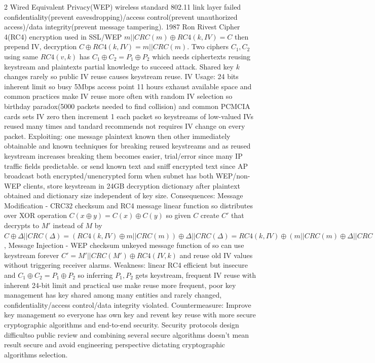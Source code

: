 \documentclass[9pt]{extarticle}
\begin{document}
\begin{multicols}{2}
Wired Equivalent Privacy(WEP) wireless standard 802.11 link layer failed confidentiality(prevent eavesdropping)/access control(prevent unauthorized access)/data integrity(prevent message tampering). 1987 Ron Rivest Cipher 4(RC4) encryption used in SSL/WEP $m||CRC(m)\oplus{RC4(k,IV)}=C$ then prepend IV, decryption $C\oplus{RC4(k,IV)}=m||CRC(m)$. Two ciphers $C_1,C_2$ using same $RC4(v,k)$ has $C_1\oplus{C_2}=P_1\oplus{P_2}$ which needs ciphertexts reusing keystream and plaintexts partial knowledge to succeed attack. Shared key $k$ changes rarely so public IV reuse causes keystream reuse. IV Usage: 24 bits inherent limit so busy 5Mbps access point 11 hours exhaust available space and common practices make IV reuse more often with random IV selection so birthday paradox(5000 packets needed to find collision) and common PCMCIA cards sets IV zero then increment 1 each packet so keystreams of low-valued IVs reused many times and tandard recommends not requires IV change on every packet. Exploiting: one message plaintext known then other immediately obtainable and known techniques for breaking reused keystreams and as reused keystream increases breaking them becomes easier, trial/error since many IP traffic fields predictable. or send known text and sniff encrypted text since AP broadcast both encrypted/unencrypted form when subnet has both WEP/non-WEP clients, store keystream in 24GB decryption dictionary after plaintext obtained and dictionary size independent of key size. Consequences: Message Modification - CRC32 checksum and RC4 message linear function so distributes over XOR operation $C(x\oplus{y})=C(x)\oplus{C(y)}$ so given $C$ create $C'$ that decrypts to $M'$ instead of $M$ by $C\oplus{\Delta||CRC(\Delta)}=(RC4(k,IV)\oplus{m||CRC(m)})\oplus{\Delta||CRC(\Delta)} = RC4(k,IV)\oplus({m||CRC(m)}\oplus{\Delta||CRC(\Delta)})= RC4(k,IV)\oplus{M'||CRC(M')}$, Message Injection - WEP checksum unkeyed message function of so can use keystream forever $C'=M'||CRC(M')\oplus{RC4(IV,k)}$ and reuse old IV values without triggering receiver alarms. Weakness: linear RC4 efficient but insecure and $C_1\oplus{C_2}=P_1\oplus{P_2}$ so inferring $P_1,P_2$ gets keystream, frequent IV reuse with inherent 24-bit limit and practical use make reuse more frequent, poor key management has key shared among many entities and rarely changed, confidentiality/access control/data integrity violated. Countermeasure: Improve key management so everyone has own key and revent key reuse with more secure cryptographic algorithms and end-to-end security. Security protocols design difficultso public review and combining several secure algorithms doesn't mean result secure and avoid engineering perspective dictating cryptographic algorithms selection.


\end{multicols}
\end{document}

